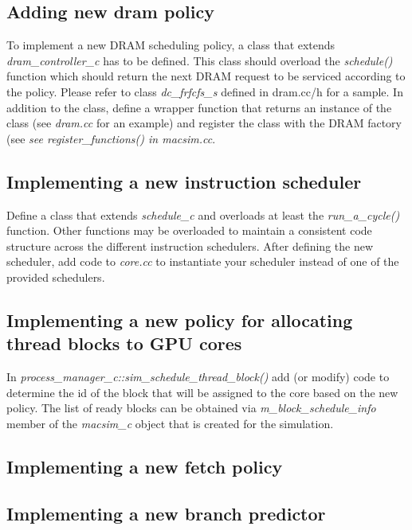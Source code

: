 \subsection{Adding new dram policy}

To implement a new DRAM scheduling policy, a class that extends
\textit{dram\_controller\_c} has to be defined. This class should overload the
\textit{schedule()} function which should return the next DRAM request to be
serviced according to the policy. Please refer to class \textit{dc\_frfcfs\_s}
defined in dram.cc/h for a sample. In addition to the class, define a wrapper
function that returns an instance of the class (see \textit{dram.cc} for an
    example) and register the class with the DRAM factory (see \textit{see
      register\_functions() in \textit{macsim.cc}}. 


\subsection{Implementing a new instruction scheduler}

Define a class that extends \textit{schedule\_c} and overloads at least the
\textit{run\_a\_cycle()} function. Other functions may be overloaded to
maintain a consistent code structure across the different instruction
schedulers. After defining the new scheduler, add code to \textit{core.cc} to
instantiate your scheduler instead of one of the provided schedulers.

\subsection{Implementing a new policy for allocating thread blocks to GPU cores}

In \textit{process\_manager\_c::sim\_schedule\_thread\_block()} add (or modify)
code to determine the id of the block that will be assigned to the core based
on the new policy. The list of ready blocks can be obtained via
\textit{m\_block\_schedule\_info} member of the \textit{macsim\_c} object that
is created for the simulation.

\subsection{Implementing a new fetch policy}

\subsection{Implementing a new branch predictor}

